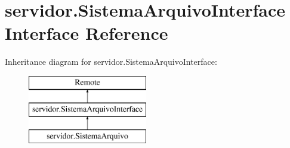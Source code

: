 \hypertarget{interfaceservidor_1_1_sistema_arquivo_interface}{\section{servidor.\+Sistema\+Arquivo\+Interface Interface Reference}
\label{interfaceservidor_1_1_sistema_arquivo_interface}
}
Inheritance diagram for servidor.\+Sistema\+Arquivo\+Interface\+:\begin{figure}[H]
\begin{center}
\leavevmode
\includegraphics[height=3.000000cm]{interfaceservidor_1_1_sistema_arquivo_interface}
\end{center}
\end{figure}
